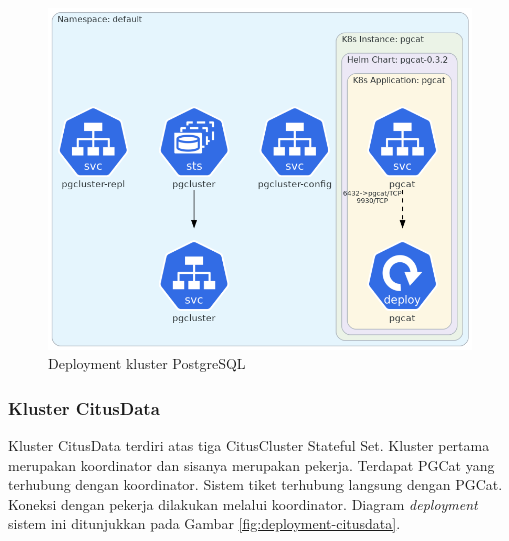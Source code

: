 \begin{figure}[H]
    \centering
    \includegraphics[width=1\textwidth]{resources/chapter-4/postgres.png}
    \caption{Deployment kluster PostgreSQL}
    \label{fig:deployment-postgres}
\end{figure}


\pagebreak

\subsubsection{Kluster CitusData}

Kluster CitusData terdiri atas tiga CitusCluster Stateful Set. Kluster pertama merupakan koordinator dan sisanya merupakan pekerja. Terdapat PGCat yang terhubung dengan koordinator. Sistem tiket terhubung langsung dengan PGCat. Koneksi dengan pekerja dilakukan melalui koordinator. Diagram \textit{deployment} sistem ini ditunjukkan pada Gambar \ref{fig:deployment-citusdata}.

